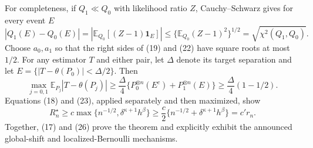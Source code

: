 For completeness, if \(Q_1\ll Q_0\) with likelihood ratio \(Z\), Cauchy--Schwarz gives for every event \(E\)
\[
 |Q_1(E)-Q_0(E)|=|\mathbb E_{Q_0}[(Z-1)\mathbf 1_E]|
 \leq\{\mathbb E_{Q_0}(Z-1)^2\}^{1/2}=\sqrt{\chi^2(Q_1,Q_0)}. \tag{24}
\]
Choose \(a_0,a_1\) so that the right sides of (19) and (22) have square roots at most \(1/2\).  For any estimator \(T\) and either pair, let \(\Delta\) denote its target separation and let \(E=\{|T-\theta(P_0)|<\Delta/2\}\).  Then
\[
 \max_{j=0,1}\mathbb E_{P_j}|T-\theta(P_j)|
 \geq\frac{\Delta}{4}\{P_0^{\otimes n}(E^c)+P_1^{\otimes n}(E)\}
 \geq\frac{\Delta}{4}(1-1/2). \tag{25}
\]
Equations (18) and (23), applied separately and then maximized, show
\[
 R_n^\star\geq c\max\{n^{-1/2},\delta^{\kappa+1}h^\beta\}
 \geq \frac c2\{n^{-1/2}+\delta^{\kappa+1}h^\beta\}=c'r_n. \tag{26}
\]
Together, (17) and (26) prove the theorem and explicitly exhibit the announced global-shift and localized-Bernoulli mechanisms.